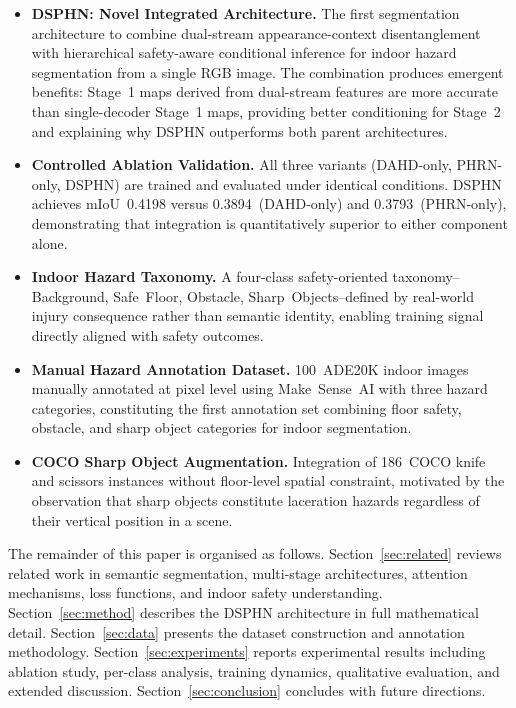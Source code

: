 \begin{itemize}
\item \textbf{DSPHN: Novel Integrated Architecture.} The first
segmentation architecture to combine dual-stream appearance-context
disentanglement with hierarchical safety-aware conditional inference
for indoor hazard segmentation from a single RGB image. The
combination produces emergent benefits: Stage~1 maps derived from
dual-stream features are more accurate than single-decoder Stage~1
maps, providing better conditioning for Stage~2 and explaining why
DSPHN outperforms both parent architectures.

\item \textbf{Controlled Ablation Validation.} All three variants
(DAHD-only, PHRN-only, DSPHN) are trained and evaluated under
identical conditions. DSPHN achieves mIoU~0.4198 versus
0.3894~(DAHD-only) and 0.3793~(PHRN-only), demonstrating that
integration is quantitatively superior to either component alone.

\item \textbf{Indoor Hazard Taxonomy.} A four-class safety-oriented
taxonomy--Background, Safe~Floor, Obstacle, Sharp~Objects--defined
by real-world injury consequence rather than semantic identity,
enabling training signal directly aligned with safety outcomes.

\item \textbf{Manual Hazard Annotation Dataset.} 100~ADE20K indoor
images manually annotated at pixel level using Make~Sense~AI with
three hazard categories, constituting the first annotation set
combining floor safety, obstacle, and sharp object categories for
indoor segmentation.

\item \textbf{COCO Sharp Object Augmentation.} Integration of
186~COCO knife and scissors instances without floor-level
spatial constraint, motivated by the observation that sharp
objects constitute laceration hazards regardless of their
vertical position in a scene.
\end{itemize}

The remainder of this paper is organised as follows.
Section~\ref{sec:related} reviews related work in semantic
segmentation, multi-stage architectures, attention mechanisms,
loss functions, and indoor safety understanding.
Section~\ref{sec:method} describes the DSPHN architecture in
full mathematical detail.
Section~\ref{sec:data} presents the dataset construction and
annotation methodology.
Section~\ref{sec:experiments} reports experimental results
including ablation study, per-class analysis, training dynamics,
qualitative evaluation, and extended discussion.
Section~\ref{sec:conclusion} concludes with future directions.

